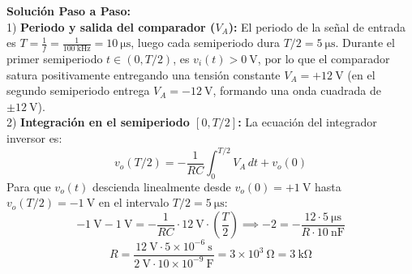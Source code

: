 \begin{ejercicio}
\textbf{Solución Paso a Paso:}\\[4pt]
1) \textbf{Periodo y salida del comparador ($V_A$):}
El periodo de la señal de entrada es $T = \frac{1}{f} = \frac{1}{100\ \si{\kilo\hertz}} = 10\ \si{\micro\second}$, luego cada semiperiodo dura $T/2 = 5\ \si{\micro\second}$.
Durante el primer semiperiodo $t \in (0, T/2)$, es $v_i(t) > 0\ \si{\volt}$, por lo que el comparador satura positivamente entregando una tensión constante $V_A = +12\ \si{\volt}$ (en el segundo semiperiodo entrega $V_A = -12\ \si{\volt}$, formando una onda cuadrada de $\pm 12\ \si{\volt}$).\\[4pt]
2) \textbf{Integración en el semiperiodo $[0, T/2]$:}
La ecuación del integrador inversor es:
\begin{equation}
    v_o(T/2) = -\frac{1}{R C} \int_0^{T/2} V_A\, dt + v_o(0)
\end{equation}
Para que $v_o(t)$ descienda linealmente desde $v_o(0) = +1\ \si{\volt}$ hasta $v_o(T/2) = -1\ \si{\volt}$ en el intervalo $T/2 = 5\ \si{\micro\second}$:
\begin{equation}
    -1\ \si{\volt} - 1\ \si{\volt} = -\frac{1}{R C} \cdot 12\ \si{\volt} \cdot \left(\frac{T}{2}\right) \implies -2 = -\frac{12 \cdot 5\ \si{\micro\second}}{R \cdot 10\ \si{\nano\farad}}
\end{equation}
\begin{equation}
    \boxed{R = \frac{12\ \si{\volt} \cdot 5 \times 10^{-6}\ \si{\second}}{2\ \si{\volt} \cdot 10 \times 10^{-9}\ \si{\farad}} = 3 \times 10^3\ \si{\ohm} = 3\ \si{\kilo\ohm}}
\end{equation}
\end{ejercicio}

